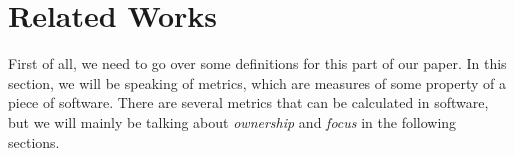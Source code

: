 \section{Related Works}

First of all, we need to go over some definitions for this part of our paper. In this section, we will be speaking of metrics, which are measures of some property of a piece of software. There are several metrics that can be calculated in software, but we will mainly be talking about \emph{ownership} and \emph{focus} in the following sections.




